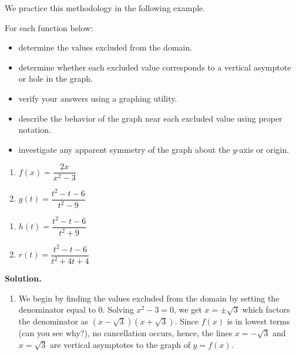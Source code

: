 \documentclass{ximera}
\begin{document}
We practice this methodology in the following example.


\begin{ex}  \label{vavsholeexample}  For each function below:

\begin{itemize}

\item  determine the values excluded from the domain.

\item   determine whether each excluded value corresponds to a vertical asymptote or hole in the graph.

\item  verify your answers using a graphing utility.

\item  describe the behavior of the graph near each excluded value using proper notation.  

\item  investigate any apparent symmetry of the graph about the $y$-axis or origin.

\end{itemize}

\begin{multicols}{2}
\begin{enumerate}

\item  $f(x) = \dfrac{2x}{x^2-3}$

\item  $g(t) = \dfrac{t^2-t-6}{t^2-9}$

\setcounter{HW}{\value{enumi}}
\end{enumerate}
\end{multicols}

\begin{multicols}{2}
\begin{enumerate}
\setcounter{enumi}{\value{HW}}


\item  $h(t) = \dfrac{t^2-t-6}{t^2+9}$

\item  $r(t) = \dfrac{t^2-t-6}{t^2+4t+4}$

\setcounter{HW}{\value{enumi}}
\end{enumerate}
\end{multicols}


{ \bf Solution.} 

\begin{enumerate}

\item  We begin by finding the values excluded from the domain by setting the denominator equal to $0$.  Solving $x^2 - 3 = 0$, we get $x = \pm \sqrt{3}$ which factors the denominator as $(x-\sqrt{3})(x+\sqrt{3})$.  Since  $f(x)$ is in lowest terms (can you see why?), no cancellation occurs,   hence,  the lines $x = -\sqrt{3}$ and $x=\sqrt{3}$ are vertical asymptotes to the graph of $y=f(x)$.  


\end{enumerate}
\end{ex}
\end{document}
